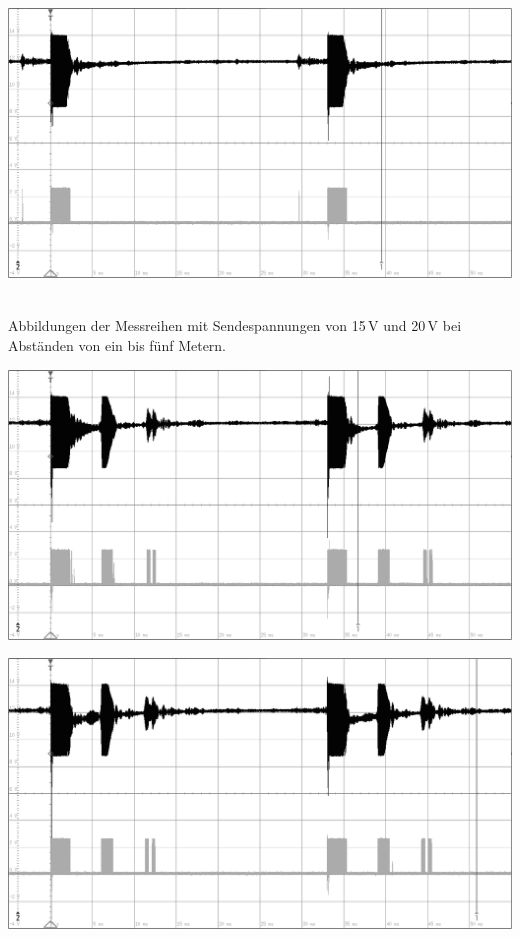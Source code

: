 \begin{minipage}{0.46\textwidth}
\includegraphics[width=1\textwidth%
]{Abbildungen/MessungenP2/10V/5m.PNG}
\end{minipage}\\
Abbildungen der Messreihen mit Sendespannungen von 15\,V und 20\,V bei Abständen von ein bis fünf Metern.\\
\begin{minipage}{0.46\textwidth}
\includegraphics[width=1\textwidth%
]{Abbildungen/MessungenP2/15V/1m.PNG}
\end{minipage}\qquad
\begin{minipage}{0.46\textwidth}
\includegraphics[width=1\textwidth%
]{Abbildungen/MessungenP2/20V/1m.PNG}
\end{minipage}\\
